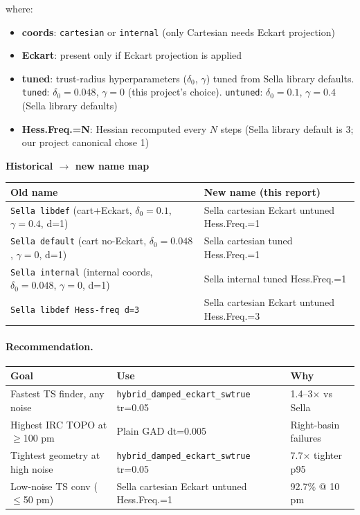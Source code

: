 \documentclass[11pt]{article}
\begin{document}
where:
\begin{itemize}[leftmargin=1.5em, itemsep=0.05em]
\item \textbf{coords}: \texttt{cartesian} or \texttt{internal} (only Cartesian needs Eckart projection)
\item \textbf{Eckart}: present only if Eckart projection is applied
\item \textbf{tuned}: trust-radius hyperparameters ($\delta_0$, $\gamma$) tuned from Sella library defaults. \texttt{tuned}: $\delta_0{=}0.048$, $\gamma{=}0$ (this project's choice). \texttt{untuned}: $\delta_0{=}0.1$, $\gamma{=}0.4$ (Sella library defaults)
\item \textbf{Hess.Freq.=N}: Hessian recomputed every $N$ steps (Sella library default is 3; our project canonical chose 1)
\end{itemize}

\begin{center}\footnotesize
\textbf{Historical $\to$ new name map}\\[0.3em]
\begin{tabular}{l|l}
\toprule
\textbf{Old name} & \textbf{New name (this report)} \\
\midrule
\texttt{Sella libdef} (cart+Eckart, $\delta_0{=}0.1$, $\gamma{=}0.4$, d=1) & Sella cartesian Eckart untuned Hess.Freq.=1 \\
\texttt{Sella default} (cart no-Eckart, $\delta_0{=}0.048$, $\gamma{=}0$, d=1) & Sella cartesian tuned Hess.Freq.=1 \\
\texttt{Sella internal} (internal coords, $\delta_0{=}0.048$, $\gamma{=}0$, d=1) & Sella internal tuned Hess.Freq.=1 \\
\texttt{Sella libdef Hess-freq d=3} & Sella cartesian Eckart untuned Hess.Freq.=3 \\
\bottomrule
\end{tabular}
\end{center}

\paragraph{Recommendation.}
\begin{center}\small
\begin{tabular}{p{}|p{}|p{}}
\toprule
\textbf{Goal} & \textbf{Use} & \textbf{Why} \\
\midrule
Fastest TS finder, any noise & \texttt{hybrid\_damped\_eckart\_swtrue} tr=0.05 & 1.4--3$\times$ vs Sella \\
Highest IRC TOPO at $\ge$100 pm & Plain GAD dt=0.005 & Right-basin failures \\
Tightest geometry at high noise & \texttt{hybrid\_damped\_eckart\_swtrue} tr=0.05 & 7.7$\times$ tighter p95 \\
Low-noise TS conv ($\le$50 pm) & Sella cartesian Eckart untuned Hess.Freq.=1 & 92.7\% @ 10 pm \\
\bottomrule
\end{tabular}
\end{center}
\end{document}
